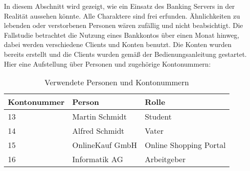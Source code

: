 In diesem Abschnitt wird gezeigt, wie ein Einsatz des Banking Servers in der Realität aussehen könnte. Alle Charaktere sind frei erfunden. Ähnlichkeiten zu lebenden oder verstorbenen Personen wären zufällig und nicht beabsichtigt. Die Fallstudie betrachtet die Nutzung eines Bankkontos über einen Monat hinweg, dabei werden verschiedene Clients und Konten benutzt. Die Konten wurden bereits erstellt und die Clients wurden gemäß der Bedienungsanleitung gestartet. Hier eine Aufstellung über Personen und zugehörige Kontonummern:

\begin{table}
\begin{tabular}{p{3 cm}| p{3 cm}| p{3 cm}}
Kontonummer & Person & Rolle\\
				\hline
				\hline
13 & Martin Schmidt & Student\\ \hline

14 & Alfred Schmidt & Vater\\ \hline

15 & OnlineKauf GmbH & Online Shopping Portal\\ \hline

16 & Informatik AG & Arbeitgeber\\ \hline
\end{tabular}\\
\caption{Verwendete Personen und Kontonummern}
\end{table}

